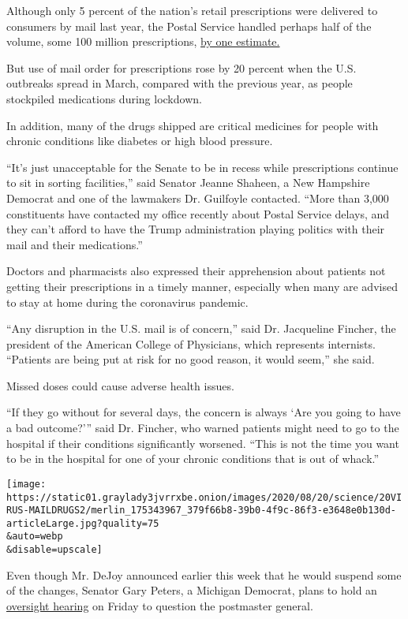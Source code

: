 Although only 5 percent of the nation's retail prescriptions were
delivered to consumers by mail last year, the Postal Service handled
perhaps half of the volume, some 100 million prescriptions,
\href{https://twitter.com/DrugChannels/status/1296146532157272064?s=20}{by
one estimate.}

But use of mail order for prescriptions rose by 20 percent when the U.S.
outbreaks spread in March, compared with the previous year, as people
stockpiled medications during lockdown.

In addition, many of the drugs shipped are critical medicines for people
with chronic conditions like diabetes or high blood pressure.

``It's just unacceptable for the Senate to be in recess while
prescriptions continue to sit in sorting facilities,'' said Senator
Jeanne Shaheen, a New Hampshire Democrat and one of the lawmakers Dr.
Guilfoyle contacted. ``More than 3,000 constituents have contacted my
office recently about Postal Service delays, and they can't afford to
have the Trump administration playing politics with their mail and their
medications.''

Doctors and pharmacists also expressed their apprehension about patients
not getting their prescriptions in a timely manner, especially when many
are advised to stay at home during the coronavirus pandemic.

``Any disruption in the U.S. mail is of concern,'' said Dr. Jacqueline
Fincher, the president of the American College of Physicians, which
represents internists. ``Patients are being put at risk for no good
reason, it would seem,'' she said.

Missed doses could cause adverse health issues.

``If they go without for several days, the concern is always `Are you
going to have a bad outcome?''' said Dr. Fincher, who warned patients
might need to go to the hospital if their conditions significantly
worsened. ``This is not the time you want to be in the hospital for one
of your chronic conditions that is out of whack.''

\texttt{[image: https://static01.graylady3jvrrxbe.onion/images/2020/08/20/science/20VIRUS-MAILDRUGS2/merlin\_175343967\_379f66b8-39b0-4f9c-86f3-e3648e0b130d-articleLarge.jpg?quality=75\\\&auto=webp\\\&disable=upscale]}

Even though Mr. DeJoy announced earlier this week that he would suspend
some of the changes, Senator Gary Peters, a Michigan Democrat, plans to
hold an
\href{https://www.peters.senate.gov/newsroom/press-releases/peters-secures-senate-oversight-hearing-with-postmaster-general-dejoy}{oversight
hearing} on Friday to question the postmaster general.


